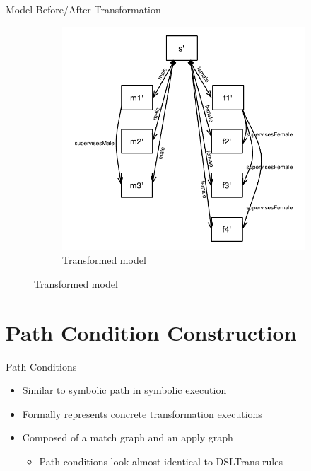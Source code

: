 \documentclass[xcolor=dvipsnames, 14pt]{beamer}
\begin{document}
\begin{frame}{Model Before/After Transformation}
\begin{figure}[htb]
\begin{subfigure}[b]{0.50\textwidth}
                \includegraphics[width=1\textwidth]{../figures/policestation_dsltrans/model_police_gender.pdf}
                \caption{Transformed model}
                \label{fig:police_gender}
        \end{subfigure}%
        \label{fig:transformationexample}
\end{figure}
\end{frame}

\section{Path Condition Construction}

\begin{frame}{Path Conditions}
\begin{itemize}
\item Similar to symbolic path in symbolic execution
\item Formally represents concrete transformation executions
\item Composed of a match graph and an apply graph
\begin{itemize}
\item Path conditions look almost identical to DSLTrans rules
\end{itemize}
\end{itemize}
\end{frame}
\end{document}
